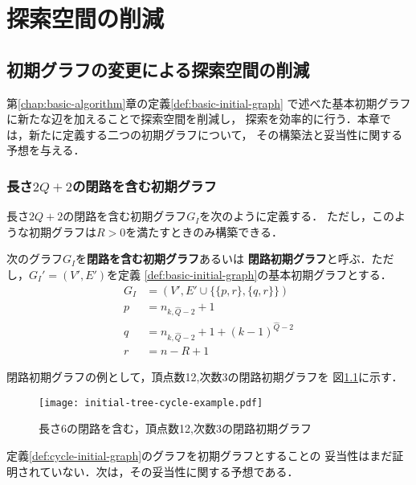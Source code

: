 
\chapter{探索空間の削減}
\label{chap:reduction}

\section{初期グラフの変更による探索空間の削減}
\label{sect:reduce-by-initial-graph}

第\ref{chap:basic-algorithm}章の定義\ref{def:basic-initial-graph}
で述べた基本初期グラフに新たな辺を加えることで探索空間を削減し，
探索を効率的に行う．本章では，新たに定義する二つの初期グラフについて，
その構築法と妥当性に関する予想を与える．

\subsection{長さ$2Q+2$の閉路を含む初期グラフ}
\label{subsect:initial-graph-cycle}
長さ$2Q+2$の閉路を含む初期グラフ$G_I$を次のように定義する．
ただし，このような初期グラフは$R>0$を満たすときのみ構築できる．

\begin{definition}\rm
  \label{def:cycle-initial-graph}
  次のグラフ$G_I$を\textbf{閉路を含む初期グラフ}あるいは
  \textbf{閉路初期グラフ}と呼ぶ．ただし，$G_I'=(V',E')$を定義
  \ref{def:basic-initial-graph}の基本初期グラフとする．
  \begin{equation}
    \begin{aligned}
      G_I&=(V',E'\cup\{\{p,r\},\{q,r\}\}) \\
      p&=n_{k,\hat{Q}-2}+1 \\
      q&=n_{k,\hat{Q}-2}+1+(k-1)^{\hat{Q}-2} \\
      r&=n-R+1
    \end{aligned}
  \end{equation}
\end{definition}

閉路初期グラフの例として，頂点数12,次数3の閉路初期グラフを
図\ref{fig:initial-graph-cycle-example}に示す．

\begin{figure}
  \centering
  \texttt{[image: initial-tree-cycle-example.pdf]}
  \caption{長さ6の閉路を含む，頂点数12,次数3の閉路初期グラフ}
  \label{fig:initial-graph-cycle-example}
\end{figure}

定義\ref{def:cycle-initial-graph}のグラフを初期グラフとすることの
妥当性はまだ証明されていない．次は，その妥当性に関する予想である．

